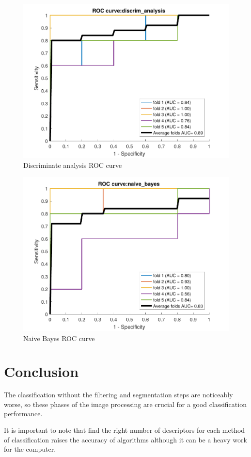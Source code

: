 \documentclass[conference]{IEEEtran}
\begin{document}
		\begin{figure}[!htp]
			\centering
			\includegraphics[width=0.7\linewidth]{images/results/discrim_analysisROC}
			\caption{Discriminate analysis ROC curve}
			\label{fig:discrimanalysisroc}
		\end{figure}
	
		\begin{figure}[!htp]
			\centering
			\includegraphics[width=0.7\linewidth]{images/results/naive_bayesROC}
			\caption{Naive Bayes ROC curve}
			\label{fig:naivebayesroc}
		\end{figure}

	\section{Conclusion}
		\par The classification without the filtering and segmentation steps are noticeably worse, so these phases of the image processing are crucial for a good classification performance.
		\par It is important to note that find the right number of descriptors for each method of classification raises the accuracy of algorithms although it can be a heavy work for the computer.
	
	
	
\end{document}
